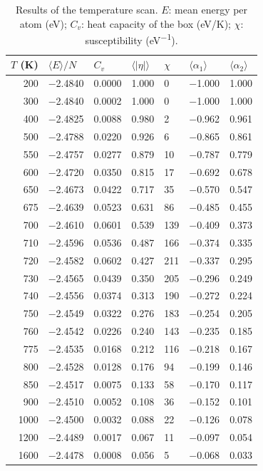 \documentclass[11pt,a4paper]{article}
\begin{document}
\begin{table}[ht]
  \centering
  \caption{Results of the temperature scan.
    $E$: mean energy per atom (eV); $C_v$: heat capacity of the box (\si{eV/K}); $\chi$: susceptibility (\si{eV^{-1}}).}
  \label{tab:full}
  \small
  \begin{tabular}{rllllll}
  \toprule
  $T$ (K) & $\langle E\rangle/N$ & $C_v$ & $\langle|\eta|\rangle$ & $\chi$ & $\langle\alpha_1\rangle$ & $\langle\alpha_2\rangle$ \\
  \midrule
  200 & $-$2.4840 & 0.0000 & 1.000 & 0 & $-$1.000 & 1.000 \\
  300 & $-$2.4840 & 0.0002 & 1.000 & 0 & $-$1.000 & 1.000 \\
  400 & $-$2.4825 & 0.0088 & 0.980 & 2 & $-$0.962 & 0.961 \\
  500 & $-$2.4788 & 0.0220 & 0.926 & 6 & $-$0.865 & 0.861 \\
  550 & $-$2.4757 & 0.0277 & 0.879 & 10 & $-$0.787 & 0.779 \\
  600 & $-$2.4720 & 0.0350 & 0.815 & 17 & $-$0.692 & 0.678 \\
  650 & $-$2.4673 & 0.0422 & 0.717 & 35 & $-$0.570 & 0.547 \\
  675 & $-$2.4639 & 0.0523 & 0.631 & 86 & $-$0.485 & 0.455 \\
  700 & $-$2.4610 & 0.0601 & 0.539 & 139 & $-$0.409 & 0.373 \\
  710 & $-$2.4596 & 0.0536 & 0.487 & 166 & $-$0.374 & 0.335 \\
  720 & $-$2.4582 & 0.0602 & 0.427 & 211 & $-$0.337 & 0.295 \\
  730 & $-$2.4565 & 0.0439 & 0.350 & 205 & $-$0.296 & 0.249 \\
  740 & $-$2.4556 & 0.0374 & 0.313 & 190 & $-$0.272 & 0.224 \\
  750 & $-$2.4549 & 0.0322 & 0.276 & 183 & $-$0.254 & 0.205 \\
  760 & $-$2.4542 & 0.0226 & 0.240 & 143 & $-$0.235 & 0.185 \\
  775 & $-$2.4535 & 0.0168 & 0.212 & 116 & $-$0.218 & 0.167 \\
  800 & $-$2.4528 & 0.0128 & 0.176 & 94 & $-$0.199 & 0.146 \\
  850 & $-$2.4517 & 0.0075 & 0.133 & 58 & $-$0.170 & 0.117 \\
  900 & $-$2.4510 & 0.0052 & 0.108 & 36 & $-$0.152 & 0.101 \\
  1000 & $-$2.4500 & 0.0032 & 0.088 & 22 & $-$0.126 & 0.078 \\
  1200 & $-$2.4489 & 0.0017 & 0.067 & 11 & $-$0.097 & 0.054 \\
  1600 & $-$2.4478 & 0.0008 & 0.056 & 5 & $-$0.068 & 0.033 \\
  \bottomrule
  \end{tabular}
\end{table}
\end{document}

